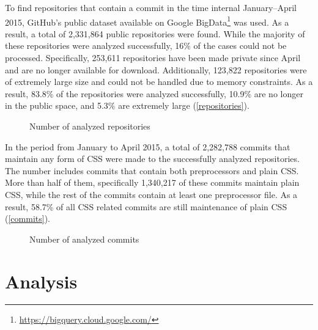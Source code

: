 To find repositories that contain a commit in the time internal January--April
2015, GitHub's public dataset available on Google
BigData\footnote{\url{https://bigquery.cloud.google.com/}} was used. As a result, a
total of 2,331,864 public repositories were found. While the majority of these
repositories were analyzed successfully, 16\% of the cases could not be
processed. Specifically, 253,611 repositories have been made private since
April and are no longer available for download. Additionally, 123,822
repositories were of extremely large size and could not be handled due to
memory constraints. As a result, 83.8\% of the repositories were analyzed
successfully, 10.9\% are no longer in the public space, and 5.3\% are
extremely large (\autoref{repositories}).

\begin{figure}
  \centering
  \caption{
    \label{repositories}
    Number of analyzed repositories}
\end{figure}


In the period from January to April 2015, a total of 2,282,788 commits that maintain
any form of CSS were made to the successfully analyzed repositories. The
number includes commits that contain both preprocessors and plain CSS. More
than half of them, specifically 1,340,217 of these commits maintain plain CSS,
while the rest of the commits contain at least one preprocessor file. As a
result, 58.7\% of all CSS related commits are still maintenance of plain CSS
(\autoref{commits}).

\begin{figure}
  \centering
  \caption{
    \label{commits}
  	Number of analyzed commits}
\end{figure}

\section{Analysis}

